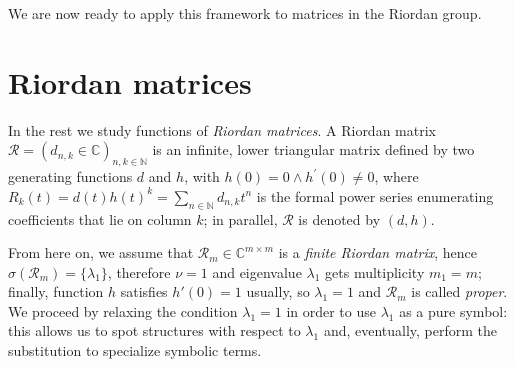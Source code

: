 We are now ready to apply this framework to matrices in the Riordan group.

\section{Riordan matrices}

In the rest we study functions of \emph{Riordan matrices}. A Riordan matrix
$\mathcal{R}=(d_{n,k}\in\mathbb{C})_{n,k\in\mathbb{N}}$ is an infinite, lower
triangular matrix defined by two generating functions $d$ and $h$, with $h(0)=0
\wedge h^{\prime}(0)\neq0$, where $R_{k}(t) = d(t)h(t)^{k} =
\sum_{n\in\mathbb{N}}{d_{n,k}t^{n}}$ is the formal power series enumerating
coefficients that lie on column $k$; in parallel, $\mathcal{R}$ is denoted by $(d,
h)$. 

From here on, we assume that $\mathcal{R}_{m}\in\mathbb{C}^{m\times m}$ is a
\emph{finite Riordan matrix}, hence $\sigma(\mathcal{R}_{m})= \lbrace
\lambda_{1} \rbrace$, therefore $\nu=1$ and eigenvalue $\lambda_{1}$ gets
multiplicity $m_{1}=m$; finally, function $h$ satisfies $h'(0)=1$ usually, so
$\lambda_{1}=1$ and $\mathcal{R}_{m}$ is called \textit{proper}.
We proceed by relaxing the condition $\lambda_{1}=1$ in order to use
$\lambda_{1}$ as a pure symbol: this allows us to spot structures with respect
to $\lambda_{1}$ and, eventually, perform the substitution to specialize
symbolic terms.

